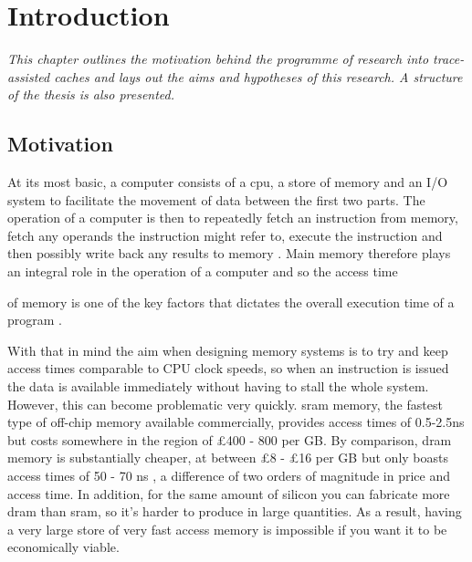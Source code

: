 \chapter{Introduction}

\emph{This chapter outlines the motivation behind the programme of research into trace-assisted caches and lays out the aims and hypotheses of this research. A structure of the thesis is also presented.}

\section{Motivation}


At its most basic, a computer consists of a \gls{cpu}, a store of memory and an I/O system to facilitate the movement of data between the first two parts. The operation of a computer is then to repeatedly fetch an instruction from memory, fetch any operands the instruction might refer to, execute the instruction and then possibly write back any results to memory \cite{przybylskiCacheMemoryHierarchy1990}. Main memory therefore plays an integral role in the operation of a computer and so the access time \begin{NoHyper}\end{NoHyper} of memory is one of the key factors that dictates the overall execution time of a program \cite{pattersonComputerOrganizationDesign2018} \cite{pattersonCaseIntelligentRAM1997}. 

With that in mind the aim when designing memory systems is to try and keep access times comparable to CPU clock speeds, so when an instruction is issued the data is available immediately without having to stall the whole system. However, this can become problematic very quickly. \gls{sram} memory, the fastest type of off-chip memory available commercially, provides access times of 0.5-2.5ns but costs somewhere in the region of £400 - 800 per GB. By comparison, \gls{dram} memory is substantially cheaper, at between £8 - £16 per GB but only boasts access times of 50 - 70 ns \cite{pattersonComputerOrganizationDesign2018}, a difference of two orders of magnitude in price and access time. In addition, for the same amount of silicon you can fabricate more \gls{dram} than \gls{sram}, so it's harder to produce in large quantities. As a result, having a very large store of very fast access memory is impossible if you want it to be economically viable.


